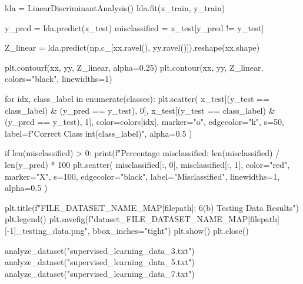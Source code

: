 \documentclass{article}
\begin{document}
{\begin{spverbatim}
  lda = LinearDiscriminantAnalysis()
  lda.fit(x_train, y_train)
  
  y_pred = lda.predict(x_test)
  misclassified = x_test[y_pred != y_test]

  Z_linear = lda.predict(np.c_[xx.ravel(), yy.ravel()]).reshape(xx.shape)

  plt.contourf(xx, yy, Z_linear, alpha=0.25)
  plt.contour(xx, yy, Z_linear, colors="black", linewidths=1)

  for idx, class_label in enumerate(classes):
    plt.scatter(
      x_test[(y_test == class_label) & (y_pred == y_test), 0],
      x_test[(y_test == class_label) & (y_pred == y_test), 1],
      color=colors[idx], marker="o", edgecolor="k", s=50, label=f"Correct Class {int(class_label)}", alpha=0.5
    )

  if len(misclassified) > 0:
    print(f"Percentage misclassified: {len(misclassified) / len(y_pred) * 100}%
    plt.scatter(
      misclassified[:, 0],
      misclassified[:, 1],
      color="red", marker="X", s=100, edgecolor="black", label="Misclassified", linewidths=1, alpha=0.5
    )
 
  plt.title(f"{FILE_DATASET_NAME_MAP[filepath]}: 6(b) Testing Data Results")
  plt.legend()
  plt.savefig(f"dataset_{FILE_DATASET_NAME_MAP[filepath][-1]}_testing_data.png", bbox_inches="tight")
  plt.show()
  plt.close()

analyze_dataset("supervised_learning_data_3.txt")
analyze_dataset("supervised_learning_data_5.txt")
analyze_dataset("supervised_learning_data_7.txt")
\end{spverbatim}

}
\end{document}
